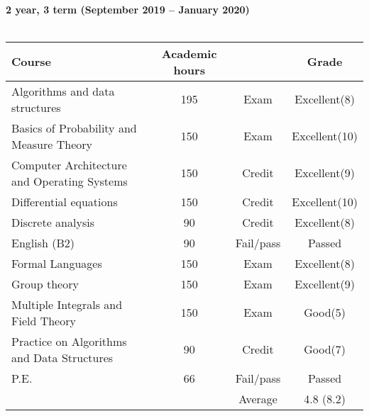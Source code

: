 \documentclass[11pt, a4paper]{report}
\begin{document}
\\
\textbf{2 year, 3 term (September 2019 -- January 2020)}\\ \\
\begin{tabular}{|p{8cm}|c|c|c|}
\hline
\textbf{Course}&\textbf{Academic hours}& &\textbf{Grade}\\
\hline
Algorithms and data structures & 195 & Exam & Excellent(8)\\
Basics of Probability and Measure Theory & 150 & Exam & Excellent(10)\\
Computer Architecture and Operating Systems & 150 & Credit & Excellent(9)\\
Differential equations & 150 & Credit & Excellent(10)\\
Discrete analysis & 90 & Credit & Excellent(8)\\
English (B2) & 90 & Fail/pass & Passed\\
Formal Languages & 150 & Exam & Excellent(8)\\
Group theory & 150 & Exam & Excellent(9)\\
Multiple Integrals and Field Theory & 150 & Exam & Good(5)\\
Practice on Algorithms and Data Structures & 90 & Credit & Good(7)\\
P.E. & 66 & Fail/pass & Passed \\
\hline
&& Average & 4.8 (8.2)\\
\hline
\end{tabular}
\end{document}
